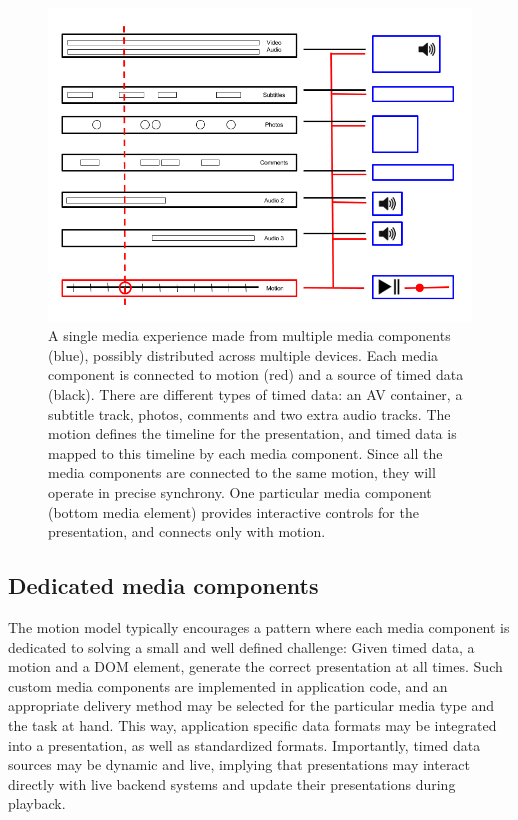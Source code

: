 \begin{figure}[h]
\centering
\includegraphics[scale=.4]{fig/motion-media.png}
\caption{A single media experience made from multiple media components (blue), possibly distributed across multiple devices. Each media component is connected to motion (red) and a source of timed data (black). There are different types of timed data: an AV container, a subtitle track, photos, comments and two extra audio tracks. The motion defines the timeline for the presentation, and timed data is mapped to this timeline by each media component. Since all the media components are connected to the same motion, they will operate in precise synchrony. One particular media component (bottom media element) provides interactive controls for the presentation, and connects only with motion.}
\label{fig:motion-media}
\end{figure}


\subsection{Dedicated media components}

The motion model typically encourages a pattern where each media
component is dedicated to solving a small and well defined challenge: Given
timed data, a motion and a DOM element, generate the correct presentation at
all times. Such custom media components are implemented in application code,
and an appropriate delivery method may be selected for the particular media
type and the task at hand. This way, application specific data formats may be
integrated into a presentation, as well as standardized formats. Importantly,
timed data sources may be dynamic and live, implying that presentations may
interact directly with live backend systems and update their presentations
during playback.

